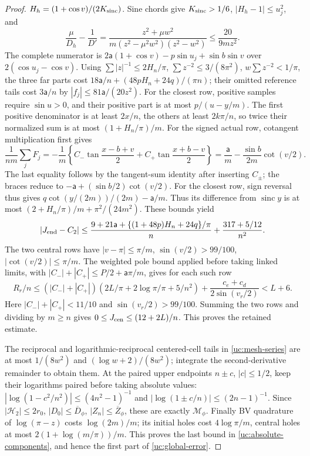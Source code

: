 \begin{proof}
$H_h=(1+\cos v)/(2K_{\rm sinc})$. Sine chords give $K_{\rm sinc}>1/6$,
$|H_h-1|\leq u_j^2$, and
\[
 \frac\mu{D_h}-\frac1{D'}
 =\frac{z^2+\mu w^2}{m(z^2-\mu^2w^2)(z^2-w^2)}
 \leq\frac{20}{9mz^2}.
\]
The complete numerator is
$2\mathsf{a}(1+\cos v)-p\sin u_j+\sin b\sin v$ over
$2(\cos u_j-\cos v)$. Using
$\sum|z|^{-1}\leq2H_n/\pi$, $\sum z^{-2}\leq3/(8\pi^2)$,
$w\sum z^{-2}<1/\pi$, the three far parts cost
$18\mathsf{a}/n+(48pH_n+24q)/(\pi n)$; their omitted reference tails cost
$3\mathsf{a}/n$ by $|f_j|\leq81\mathsf{a}/(20z^2)$.
For the closest row, positive samples require $\sin u>0$, and their
positive part is at most $p/(u-y/m)$. The first positive denominator
is at least $2x/n$, the others at least $2k\pi/n$, so twice their
normalized sum is at most $(1+H_n/\pi)/m$.
For the signed actual row, cotangent multiplication first gives
\[
\frac1{nm}\sum_jF_j=-\frac1m
\left\{C_-\tan\frac{x-b+v}{2}+C_+\tan\frac{x+b-v}{2}\right\}
=\frac{\mathsf a}{m}-\frac{\sin b}{2m}\cot(v/2).
\]
The last equality follows by the tangent-sum identity after inserting
$C_\pm$; the braces reduce to $-\mathsf a+(\sin b/2)\cot(v/2)$.
For the closest row, sign reversal thus gives
$q\cot(y/(2m))/(2m)-\mathsf a/m$.
Thus its difference from $\operatorname{sinc}y$ is at most
$(2+H_n/\pi)/m+\pi^2/(24m^2)$.
These bounds yield
\[
 |J_{\rm end}-C_2|\leq
 \frac{9+21\mathsf{a}+\{(1+48p)H_n+24q\}/\pi}{n}
                  +\frac{317+5/12}{n^2}.
\]
The two central rows have $|v-\pi|\leq\pi/m$,
$\sin(v/2)>99/100$, $|\cot(v/2)|\leq\pi/m$.
The weighted pole bound applied before taking linked limits, with
$|C_-|+|C_+|\leq P/2+\mathsf{a}\pi/m$, gives for each such row
\[
 R_r/n\leq(|C_-|+|C_+|)(2L/\pi+2\log\pi/\pi+5/n^2)
                   +\frac{c_e+c_d}{2\sin(v_r/2)}<L+6.
\]
Here $|C_-|+|C_+|<11/10$ and $\sin(v_r/2)>99/100$.
Summing the two rows and dividing by $m\geq n$ gives
$0\leq J_{\rm cen}\leq(12+2L)/n$. This proves the retained estimate.

The reciprocal and logarithmic-reciprocal centered-cell tails in
\eqref{uc:mesh-series} are at most $1/(8w^2)$ and
$(\log w+2)/(8w^2)$; integrate the second-derivative remainder to
obtain them. At the paired upper endpoints $n\pm c$, $|c|\leq1/2$,
keep their logarithms paired before taking absolute values:
$|\log(1-c^2/n^2)|\leq(4n^2-1)^{-1}$ and
$|\log(1\pm c/n)|\leq(2n-1)^{-1}$.
Since $|\mathcal H_2|\leq2r_0$, $|D_0|\leq\overline D_\phi$,
$|Z_n|\leq\overline Z_\phi$, these are exactly $\mathcal M_\phi$.
Finally BV quadrature of $\log(\pi-z)$ costs $\log(2m)/m$;
its initial holes cost $4\log\pi/m$, central holes at most
$2(1+\log(m/\pi))/m$. This proves the last bound in
\eqref{uc:absolute-components}, and hence the first part of
\eqref{uc:global-error}.


\end{proof}
